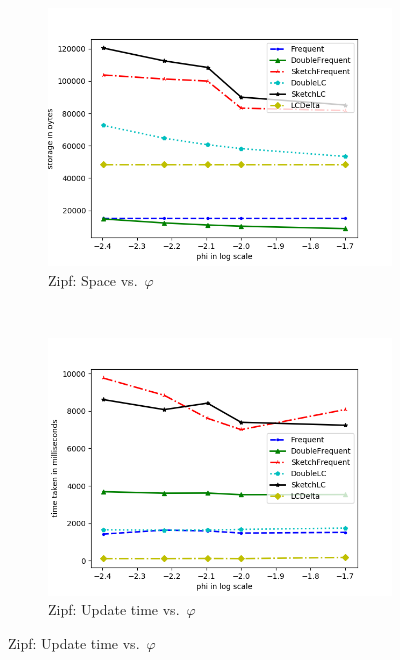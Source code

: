 \documentclass[sigconf,review=true,anonymous=true,screen]{acmart}
\renewcommand{\phi}{\varphi}
\begin{document}
\begin{figure}[!h]
\centering
\begin{subfigure}[b]{0.3\textwidth}
\includegraphics[width=\textwidth]{../Plots/storage_phiskew.png}
\caption{Zipf: Space vs.~$\phi$}
\label{fig:zipspphi}
\end{subfigure}
~
\begin{subfigure}[b]{0.3\textwidth}
\includegraphics[width=\textwidth]{../Plots/time_phiskew.png}
\caption{Zipf: Update time vs.~$\phi$}
\label{fig:ziptimphi}
\end{subfigure}


\end{figure}
\end{document}
